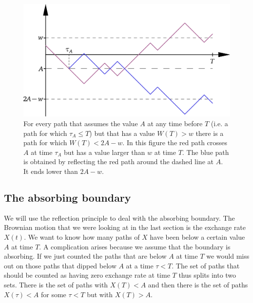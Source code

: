 \documentclass[12pt, oneside]{article}
\begin{document}
\begin{center}
\begin{figure}[hbt]
  \includegraphics[width=12cm]{reflectionPrinciple.png}
  \caption{For every path that assumes the value $A$ at any time before $T$ (i.e. a path for which $\tau_A\le T$) but that has a value $W(T)> w$ there is a path for which $W(T)<2A-w$. In this figure the red path crosses $A$ at time $\tau_A$ but has a value larger than $w$ at time $T$. The blue path is obtained by reflecting the red path around the dashed line at $A$. It ends lower than $2A-w$.}\label{fig:reflection}
\end{figure}	
\end{center}

\subsection{The absorbing boundary}
We will use the reflection principle to deal with the absorbing  boundary. The Brownian motion that we were looking at in the last section is the exchange rate $X(t)$. We want to know how many paths of $X$ have been below a certain value $A$ at time $T$. A complication arises because we assume that the boundary is absorbing. If we just counted the paths that are below $A$ at time $T$ we would miss out on those paths that dipped below $A$ at a time $\tau<T$. The set of paths that should be counted as having zero exchange rate at time $T$ thus splits into two sets. There is the set of paths with $X(T)<A$ and then there is the set of paths $X(\tau)<A$ for some $\tau<T$ but with $X(T)>A$.
\end{document}
